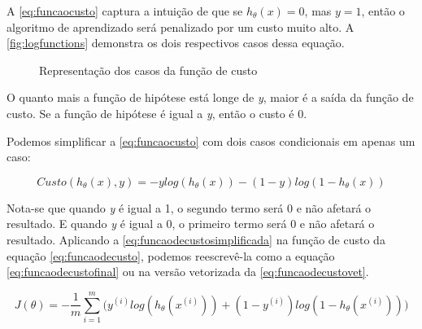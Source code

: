 A \autoref{eq:funcaocusto} captura a intuição de que se $h_\theta(x) = 0$, mas $y = 1$, então o algoritmo de aprendizado será penalizado por um custo muito alto. A \autoref{fig:logfunctions} demonstra os dois respectivos casos dessa equação.


\begin{figure}[!htb]
  \caption{Representação dos casos da função de custo}
  \label{fig:logfunctions}
  \begin{center}
  \end{center}
\end{figure}


O quanto mais a função de hipótese está longe de \textit{y}, maior é a saída da função de custo. Se a função de hipótese é igual a \textit{y}, então o custo é 0.

Podemos simplificar a \autoref{eq:funcaocusto} com dois casos condicionais em apenas um caso:

\begin{equation} 
\label{eq:funcaodecustosimplificada}
Custo(h_{\theta}(x), y) = -ylog(h_{\theta}(x)) - (1-y)log(1 - h_{\theta}(x))
\end{equation}

Nota-se que quando \textit{y} é igual a 1, o segundo termo será 0 e não afetará o resultado. E quando \textit{y} é igual a 0, o primeiro termo será 0 e não afetará o resultado. Aplicando a \autoref{eq:funcaodecustosimplificada} na função de custo da equação \autoref{eq:funcaodecusto}, podemos reescrevê-la como a equação \autoref{eq:funcaodecustofinal} ou na versão vetorizada da \autoref{eq:funcaodecustovet}.

\begin{equation}
\label{eq:funcaodecustofinal}
J(\theta) = - \frac{1}{m}\sum\limits_{i=1}^{m}\Big( y^{(i)}log(h_{\theta}(x^{(i)})) + (1-y^{(i)})log(1 - h_{\theta}(x^{(i)})) \Big)
\end{equation}

